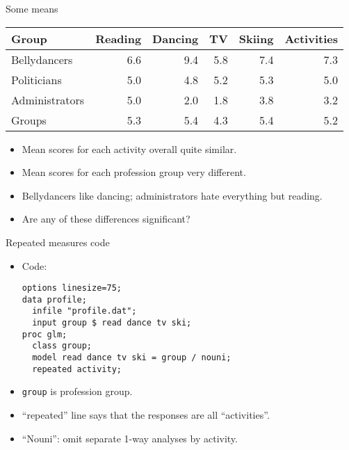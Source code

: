 \documentclass[pdf]{prosper}
\begin{document}
\begin{slide}{Some means}

  \begin{tabular}{|l|rrrr|r|}
    \hline
    Group & Reading & Dancing & TV & Skiing & Activities\\
    \hline
    Bellydancers & 6.6 & 9.4 & 5.8 & 7.4 & 7.3\\
    Politicians & 5.0 & 4.8 & 5.2 & 5.3 & 5.0\\
    Administrators & 5.0 & 2.0 & 1.8 & 3.8 & 3.2\\
    \hline
    Groups & 5.3 & 5.4 & 4.3 & 5.4 & 5.2\\
    \hline
  \end{tabular}
  
  \vspace{3ex}

  \begin{itemize}
  \item Mean scores for each activity overall quite similar.
  \item Mean scores for each profession group very different.
  \item Bellydancers like dancing; administrators hate everything but
    reading.
  \item Are any of these differences significant?
  \end{itemize}
  
\end{slide}

\begin{slide}{Repeated measures code}

  \begin{itemize}
  \item Code:

\begin{verbatim}
options linesize=75;
data profile;
  infile "profile.dat";
  input group $ read dance tv ski;
proc glm;
  class group;
  model read dance tv ski = group / nouni;
  repeated activity;

\end{verbatim}
  \item \verb-group- is profession group.
  \item ``repeated'' line says that the responses are all ``activities''.
  \item ``Nouni'': omit separate 1-way analyses by activity.
\end{itemize}
  
\end{slide}
\end{document}

